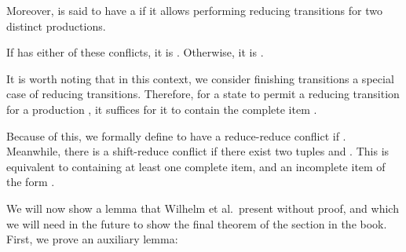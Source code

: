 \begin{isabellebody}
\begin{isamarkuptext}
\begin{definition}
Moreover,  is said to have a  if it allows performing reducing
transitions for two distinct productions.

If  has either of these conflicts, it is . Otherwise, it is 
.
\end{definition}

It is worth noting that in this context, we consider finishing transitions a special case of reducing
transitions. Therefore, for a state to permit a reducing transition for a production ,
it suffices for it to contain the complete item .

Because of this, we formally define  to have a reduce-reduce conflict if 
. Meanwhile, there is a shift-reduce conflict if there exist two 
tuples  and . This is
equivalent to  containing at least one complete item, and an incomplete item of the form 
.

We will now show a lemma that Wilhelm et al.\ present without proof, and which we will need in the
future to show the final theorem of the  section in the book. First, we prove an auxiliary
lemma:


\end{isamarkuptext}
\end{isabellebody}
